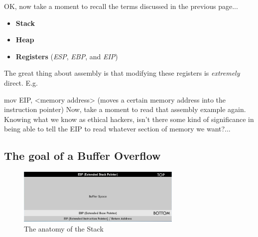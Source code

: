 \documentclass[a4paper,11pt]{article}
\renewcommand{\tt}[2][tt]{\textcolor{#1}{\ttfamily #2}}%
\begin{document}
OK, now take a moment to recall the terms discussed in the previous page...

\begin{itemize}
    \item {\bfseries Stack}
    \item {\bfseries Heap}
    \item {\bfseries Registers} (\textit{ESP}, \textit{EBP}, and \textit{EIP})
\end{itemize}

The great thing about assembly is that modifying these registers is \textit{extremely} direct. E.g.

\tt{mov EIP, <memory address>} (moves a certain memory address into the instruction pointer)
\newline
\newline
Now, take a moment to read that assembly example again. Knowing what we know as ethical hackers, isn't there some kind of significance in being able to tell the EIP to read whatever section of memory we want?...

\newpage

\subsection{The goal of a Buffer Overflow}

\begin{figure}[h]
    \centering
    \includegraphics[width=0.7\textwidth]{images/stackanatomy.png}
    \caption{The anatomy of the Stack}
\end{figure}
\end{document}
